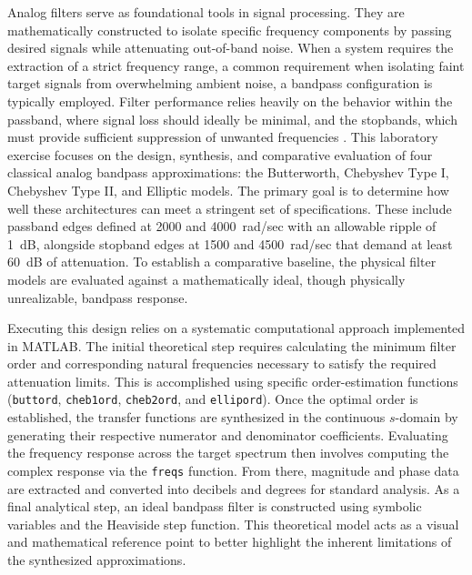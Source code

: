 Analog filters serve as foundational tools in signal processing. They are mathematically constructed to isolate specific frequency components by passing desired signals while attenuating out-of-band noise. When a system requires the extraction of a strict frequency range, a common requirement when isolating faint target signals from overwhelming ambient noise, a bandpass configuration is typically employed. Filter performance relies heavily on the behavior within the passband, where signal loss should ideally be minimal, and the stopbands, which must provide sufficient suppression of unwanted frequencies \cite{riskin2003}. This laboratory exercise focuses on the design, synthesis, and comparative evaluation of four classical analog bandpass approximations: the Butterworth, Chebyshev Type I, Chebyshev Type II, and Elliptic models. The primary goal is to determine how well these architectures can meet a stringent set of specifications. These include passband edges defined at 2000 and 4000~rad/sec with an allowable ripple of 1~dB, alongside stopband edges at 1500 and 4500~rad/sec that demand at least 60~dB of attenuation. To establish a comparative baseline, the physical filter models are evaluated against a mathematically ideal, though physically unrealizable, bandpass response.

Executing this design relies on a systematic computational approach implemented in MATLAB. The initial theoretical step requires calculating the minimum filter order and corresponding natural frequencies necessary to satisfy the required attenuation limits. This is accomplished using specific order-estimation functions (\texttt{buttord}, \texttt{cheb1ord}, \texttt{cheb2ord}, and \texttt{ellipord}). Once the optimal order is established, the transfer functions are synthesized in the continuous $s$-domain by generating their respective numerator and denominator coefficients. Evaluating the frequency response across the target spectrum then involves computing the complex response via the \texttt{freqs} function. From there, magnitude and phase data are extracted and converted into decibels and degrees for standard analysis. As a final analytical step, an ideal bandpass filter is constructed using symbolic variables and the Heaviside step function. This theoretical model acts as a visual and mathematical reference point to better highlight the inherent limitations of the synthesized approximations.
